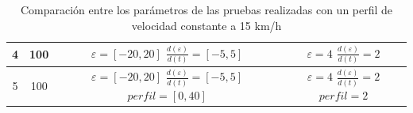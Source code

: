 \begin{table}[!h]
\begin{tabular}{|c|c|c|c|}
4 & 100 & \parbox[t]{3cm} {\hspace{8 px} $\varepsilon=[-20,20]$ \\ $\frac{d(\varepsilon)}{d(t)}=[-5,5]$} &  \parbox[t]{3cm} {\hspace{11 px}$\varepsilon=4$\\ $\frac{d(\varepsilon)}{d(t)}=2$} \\ 
\hline

5 & 100 & \parbox[t]{3cm} {\hspace{8 px} $\varepsilon=[-20,20]$ \\ $\frac{d(\varepsilon)}{d(t)}=[-5,5]$ \\ $perfil=[0,40]$} &  \parbox[t]{3cm} {\hspace{11 px}$\varepsilon=4$\\ $\frac{d(\varepsilon)}{d(t)}=2$\\$perfil=2$} \\ 
\hline  
\end{tabular}
\caption{Comparación entre los parámetros de las pruebas realizadas con un perfil de velocidad constante a 15 km/h}
\label{tab:comparacionPruebas}
\end{table}



